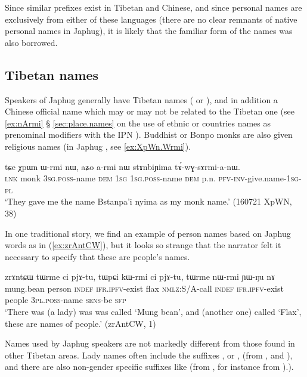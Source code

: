 Since similar  prefixes exist in Tibetan and Chinese, and since personal names are exclusively from either of these languages (there are no clear remnants of native personal names in Japhug), it is likely that the familiar form of the names was also borrowed.

\subsection{Tibetan names} \label{sec:names.tibet}
Speakers of Japhug generally have Tibetan names ( or ), and in addition a Chinese official name which may or may not be related to the Tibetan one (see \ref{ex:nArmi} § \ref{sec:place.names} on the use of ethnic or countries names as prenominal modifiers with the IPN ). Buddhist or Bonpo monks are also given religious names (in Japhug , see \ref{ex:XpWn.Wrmi}). 
 
\begin{exe}
\ex \label{ex:XpWn.Wrmi}
\gll tɕe χpɯn ɯ-rmi nɯ, aʑo a-rmi nɯ stɤnbiɲima tɤ́-wɣ-sɤrmi-a-nɯ. \\
\textsc{lnk} monk \textsc{3sg}.\textsc{poss}-name \textsc{dem} \textsc{1sg} \textsc{1sg}.\textsc{poss}-name \textsc{dem} p.n. \textsc{pfv}-\textsc{inv}-give.name-\textsc{1sg}-\textsc{pl} \\
\glt `They gave me the name Bstanpa'i nyima as my monk name.' (160721 XpWN, 38)
\end{exe}

In one traditional story, we find an example of person names based on Japhug words as in (\ref{ex:zrAntCW}), but it looks so strange that the narrator felt it necessary to specify that these are people's names.

\begin{exe}
\ex  \label{ex:zrAntCW}
 \gll zrɤntɕɯ tɯrme ci pjɤ-tu, tɯpɕi kɯ-rmi ci pjɤ-tu, tɯrme nɯ-rmi ɲɯ-ŋu nɤ \\
mung.bean person \textsc{indef} \textsc{ifr}.\textsc{ipfv}-exist flax \textsc{nmlz}:S/A-call  \textsc{indef} \textsc{ifr}.\textsc{ipfv}-exist people  \textsc{3pl}.\textsc{poss}-name \textsc{sens}-be \textsc{sfp} \\
\glt `There was (a lady) was was called `Mung bean', and (another one) called `Flax', these are names of people.' (zrAntCW, 1)
\end{exe}

Names used by Japhug speakers are not markedly different from those found in other Tibetan areas. Lady names often include the suffixes ,  or , (from ,  and ), and there are also non-gender specific suffixes like  (from , for instance  from ).). 

